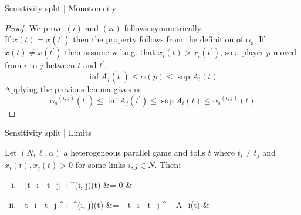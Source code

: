 \documentclass{beamer}
\newcommand{\as}{\mathrm{\alpha_s}}
\begin{document}
\begin{frame}{Sensitivity split | Monotonicity}
	\begin{proof}
		We prove $(i)$ and $(ii)$ follows symmetrically.\\
		If $x(t) = x(t^\prime)$ then the property follows from the definition of $\as$.
		If $x(t) \ne x(t^\prime)$ then assume w.l.o.g. that $x_i(t) > x_i(t^\prime)$, so a player $p$ moved from $i$ to $j$ between $t$ and $t^\prime$.
		\[\inf A_j(t^\prime) \le \alpha(p) \le \sup A_i(t)\]
		Applying the previous lemma gives us
		\[\as^{(i, j)}(t^\prime) \le \inf A_j(t^\prime) \le \sup A_i(t) \le \as^{(i, j)}(t)\]
	\end{proof}
\end{frame}

\begin{frame}{Sensitivity split | Limits}
	\begin{lemma}
		Let $(N, \ell, \alpha)$ a heterogeneous parallel game and tolls $t$ where $t_i \ne t_j$ and $x_i(t), x_j(t) > 0$ for some links $i, j \in N$.
		Then:
		\begin{enumerate}[(i)]
			\item
			\begin{flalign*}
				\lim_{|t_i - t_j| \rightarrow +\infty}\as^{(i, j)}(t) &= 0 &
			\end{flalign*}
			\item
			\begin{flalign*}
				\lim_{t_i - t_j ^+} \as^{(i, j)}(t) &= \limsup_{t_i - t_j ^+} A_i(t) &
			\end{flalign*}
		\end{enumerate}
	\end{lemma}
\end{frame}
\end{document}
